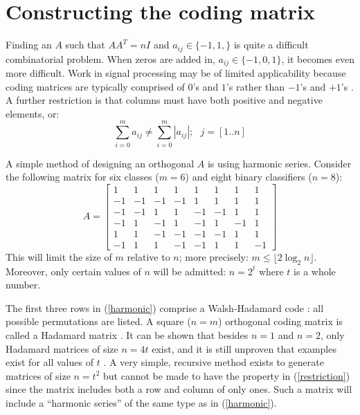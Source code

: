\section{Constructing the coding matrix}

\label{construction}

Finding an $A$ such that $A A^T = n I$ and $a_{ij} \in \lbrace -1, 1, \rbrace$
is quite a difficult combinatorial problem.
When zeros are added in, $a_{ij}\in \lbrace -1, 0, 1\rbrace$,
it becomes even more difficult.
Work in signal processing may be of limited applicability because coding
matrices are typically comprised of $0$'s and $1$'s 
rather than $-1$'s and $+1$'s \citep{Hedayat_etal1999,Panse_etal2014}.
A further restriction is that
columns must have both positive and negative elements, or:
\begin{equation}
	\sum_{i=0}^m a_{ij} \ne \sum_{i=0}^m |a_{ij}|;  ~~~ j=[1..n] \label{restriction}
\end{equation}

A simple method of designing an orthogonal $A$ is using harmonic series.
Consider the following matrix for six classes ($m=6$) 
and eight binary classifiers ($n=8$):
\begin{equation}
	A = \left [ \begin{array}{rrrrrrrr}
			 1 & 1 & 1 & 1 & 1 & 1 & 1 & 1 \\
			-1 & -1 & -1 & -1 & 1 & 1 & 1 & 1 \\
			-1 & -1 & 1 & 1 & -1 & -1 & 1 & 1 \\
			-1 & 1 & -1 & 1 & -1 & 1 & -1 & 1 \\
			 1 &  1 & -1 & -1 & -1 & -1 & 1 & 1 \\
			-1 & 1 & 1 & -1 & -1 & 1 & 1 & -1 
	\end{array} \right ]
	\label{harmonic}
\end{equation}
This will limit the size of $m$ relative to $n$; more precisely:
$m \le \lfloor 2 \log_2 n \rfloor$. Moreover, only certain values of $n$
will be admitted: $n=2^t$ where $t$ is a whole number.

The first three rows in (\ref{harmonic}) comprise a Walsh-Hadamard code \citep{Arora_Barak2009}:
all possible permutations are listed.
A square ($n=m$) orthogonal coding matrix is called a Hadamard matrix
\citep{Sylvester1867}.
It can be shown that besides $n=1$ and $n=2$, only Hadamard matrices of size
$n=4t$ exist,  
and it is still unproven that examples exist for all values of $t$
\citep{Hedayat_Wallis1978}.
A very simple, recursive method exists to generate matrices of size $n=t^2$ 
\citep{Hedayat_Wallis1978} but cannot be made to have the property in (\ref{restriction})
since the matrix includes both a row and column of only ones.
Such a matrix will include a ``harmonic series'' of the same type as in
(\ref{harmonic}).

